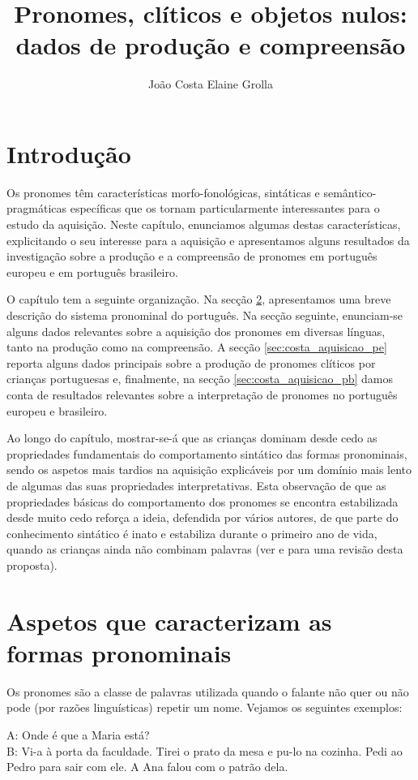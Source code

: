 \documentclass[output=paper]{LSP/langsci}
\author{João Costa\affiliation{Centro de Línguistica da Universidade Nova de Lisboa \& Faculdade de Ciências Sociais e Humanas da Universidade Nova de Lisboa}\lastand 
Elaine Grolla\affiliation{Universidade de São Paulo}
}
\title{Pronomes, clíticos e objetos nulos: dados de produção e compreensão}
\begin{document}
\section{Introdução}
\label{sec:costa_intro}

Os pronomes têm características morfo-fonológicas, sintáticas e se\-mân\-ti\-co-prag\-má\-ti\-cas específicas que os tornam particularmente interessantes para o estudo da aquisição. Neste capítulo, enunciamos algumas destas características, explicitando o seu interesse para a aquisição e apresentamos alguns resultados da investigação sobre a produção e a compreensão de pronomes em português europeu e em português brasileiro. 

O capítulo tem a seguinte organização. Na secção \ref{sec:costa_aspetos}, apresentamos uma breve descrição do sistema pronominal do português. Na secção seguinte, enunciam-se alguns dados relevantes sobre a aquisição dos pronomes em diversas línguas, tanto na produção como na compreensão. A secção \ref{sec:costa_aquisicao_pe} reporta alguns dados principais sobre a produção de pronomes clíticos por crianças portuguesas e, finalmente, na secção \ref{sec:costa_aquisicao_pb} damos conta de resultados relevantes sobre a interpretação de pronomes no português europeu e brasileiro.

Ao longo do capítulo, mostrar-se-á que as crianças dominam desde cedo as propriedades fundamentais do comportamento sintático das formas pronominais, sendo os aspetos mais tardios na aquisição explicáveis por um domínio mais lento de algumas das suas propriedades interpretativas. Esta observação de que as propriedades básicas do comportamento dos pronomes se encontra estabilizada desde muito cedo reforça a ideia, defendida por vários autores, de que parte do conhecimento sintático é inato e estabiliza durante o primeiro ano de vida, quando as crianças ainda não combinam palavras (ver \citealt{guasti2002} e \citealt{wexler1998} para uma revisão desta proposta).

\section{Aspetos que caracterizam as formas pronominais}
\label{sec:costa_aspetos}

Os pronomes são a classe de palavras utilizada quando o falante não quer ou não pode (por razões linguísticas) repetir um nome. Vejamos os seguintes exemplos:

\ea\label{ex:costa_1}
A: Onde é que a Maria está?\\B: Vi-a à  porta da faculdade.
\z
\ea\label{ex:costa_2}
Tirei o prato da mesa e pu-lo na cozinha.
\z
\ea\label{ex:costa_3}
Pedi ao Pedro para sair com ele.
\z
\ea\label{ex:costa_4}
A Ana falou com o patrão dela.
\z
\end{document}
